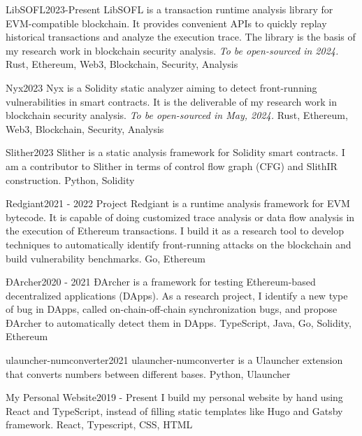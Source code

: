 \documentclass[localFont,alternative]{documentMETADATA}
\begin{document}
\begin{projects}
	\project
	{LibSOFL}{2023-Present}
	{LibSOFL is a transaction runtime analysis library for EVM-compatible blockchain. It provides convenient APIs to quickly replay historical transactions and analyze the execution trace. The library is the basis of my research work in blockchain security analysis.}
	{\textit{To be open-sourced in 2024.}}
	{Rust, Ethereum, Web3, Blockchain, Security, Analysis}

	\project
	{Nyx}{2023}
	{Nyx is a Solidity static analyzer aiming to detect front-running vulnerabilities in smart contracts. It is the deliverable of my research work in blockchain security analysis.}
	{\textit{To be open-sourced in May, 2024.}}
	{Rust, Ethereum, Web3, Blockchain, Security, Analysis}


	\project
	{Slither}{2023}
	{}
	{Slither is a static analysis framework for Solidity smart contracts. I am a contributor to Slither in terms of control flow graph (CFG) and SlithIR construction.}
	{Python, Solidity}

	\project
	{Redgiant}{2021 - 2022}
	{}
	{Project Redgiant is a runtime analysis framework for EVM bytecode. It is capable of doing customized trace analysis or data flow analysis in the execution of Ethereum transactions. I build it as a research tool to develop techniques to automatically identify front-running attacks on the blockchain and build vulnerability benchmarks.}
	{Go, Ethereum}

	\project
	{ĐArcher}{2020 - 2021}
	{}
	{ĐArcher is a framework for testing Ethereum-based decentralized applications (DApps). As a research project, I identify a new type of bug in DApps, called on-chain-off-chain synchronization bugs, and propose ĐArcher to automatically detect them in DApps.}
	{TypeScript, Java, Go, Solidity, Ethereum}

	\project
	{ulauncher-numconverter}{2021}
	{}
	{ulauncher-numconverter is a Ulauncher extension that converts numbers between different bases.}
	{Python, Ulauncher}


	\project
	{My Personal Website}{2019 - Present}
	{}
	{I build my personal website by hand using React and TypeScript, instead of filling static templates like Hugo and Gatsby framework.}
	{React, Typescript, CSS, HTML}

\end{projects}
\end{document}
